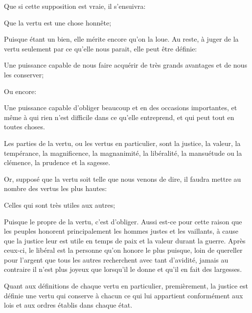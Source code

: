 Que si cette supposition est vraie, il s'ensuivra:

\begin{lieu}
	Que la vertu est une chose honnête;
\end{lieu}

Puisque étant un bien, elle mérite encore qu'on la loue. Au reste, à juger de la vertu seulement par ce qu'elle
nous parait, elle peut être définie:

\begin{emphpar}
	Une puissance capable de nous faire acquérir de très grands avantages et de nous les conserver;
\end{emphpar}

Ou encore:

\begin{emphpar}
	Une puissance capable d'obliger beaucoup et en des occasions importantes, et même à qui rien n'est difficile
	dans ce qu'elle entreprend, et qui peut tout en toutes choses.
\end{emphpar}

\bigbreak

Les parties de la vertu, ou les vertus en particulier, sont la justice, la valeur, la tempérance, la magnificence,
la magnanimité, la libéralité, la mansuétude ou la clémence, la prudence et la sagesse.

\bigbreak

Or, supposé que la vertu soit telle que nous venons de dire, il faudra mettre au nombre des vertus les plus hautes:

\begin{lieu}
	Celles qui sont très utiles aux autres;
\end{lieu}

Puisque le propre de la vertu, c'est d'obliger. Aussi est-ce pour cette raison que les peuples honorent
principalement les hommes justes et les vaillants, à cause que la justice leur est utile en temps de paix
et la valeur durant la guerre. Après ceux-ci, le libéral est la personne qu'on honore le plus puisque, loin
de quereller pour l'argent que tous les autres recherchent avec tant d'avidité, jamais au contraire il n'est
plus joyeux que lorsqu'il le donne et qu'il en fait des largesses.

\bigbreak

Quant aux définitions de chaque vertu en particulier, premièrement, la justice est définie une vertu qui
conserve à chacun ce qui lui appartient conformément aux lois et aux ordres établis dans chaque état.

